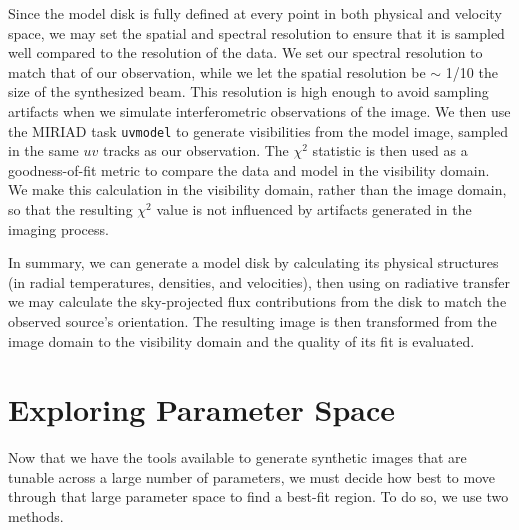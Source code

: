 Since the model disk is fully defined at every point in both physical and velocity space, we may set the spatial and spectral resolution to ensure that it is sampled well compared to the resolution of the data. We set our spectral resolution to match that of our observation, while we let the spatial resolution be $\sim$ 1/10 the size of the synthesized beam. This resolution is high enough to avoid sampling artifacts when we simulate interferometric observations of the image. We then use the \textsc{MIRIAD} task \texttt{uvmodel} to generate visibilities from the model image, sampled in the same $uv$ tracks as our observation. The $\chi^2$ statistic is then used as a goodness-of-fit metric to compare the data and model in the visibility domain. We make this calculation in the visibility domain, rather than the image domain, so that the resulting $\chi^2$ value is not influenced by artifacts generated in the imaging process.


In summary, we can generate a model disk by calculating its physical structures (in radial temperatures, densities, and velocities), then using on radiative transfer we may calculate the sky-projected flux contributions from the disk to match the observed source's orientation. The resulting image is then transformed from the image domain to the visibility domain and the quality of its fit is evaluated.



\section{Exploring Parameter Space}
\label{section:param_space}

Now that we have the tools available to generate synthetic images that are tunable across a large number of parameters, we must decide how best to move through that large parameter space to find a best-fit region. To do so, we use two methods.

